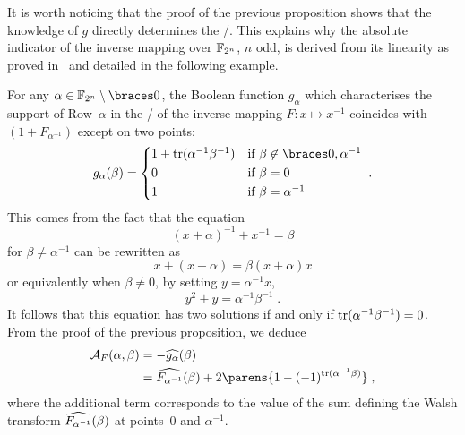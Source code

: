It is worth noticing that the proof of the previous proposition shows that the knowledge of $g$ directly determines the \ACT/.
This explains why the absolute indicator of the inverse mapping over $\mathbb{F}_{2^n}$, $n$ odd, is derived from its linearity as proved in~\cite[Theorem~1]{FF:ChaHelZin07} and detailed in the following example.
\begin{example}
    For any $\alpha \in \F_{2^n} \setminus \set{0}$, the Boolean function $g_\alpha$ which characterises the support of Row~$\alpha$ in the \DDT/ of the inverse mapping $F:x \mapsto x^{-1}$ coincides with $(1+F_{\alpha^{-1}})$ except on two points:
    \begin{equation*}
        g_\alpha(\beta) = \begin{cases*}
            1+\tr(\alpha^{-1}\beta^{-1}) & if $\beta \not \in \set{0, \alpha^{-1}}$\\
            0                            & if $\beta = 0$\\
            1                            & if $\beta = \alpha^{-1}$
        \end{cases*}\;.
    \end{equation*}
    This comes from the fact that the equation
    \begin{equation*}
        (x+\alpha)^{-1} + x^{-1} = \beta
    \end{equation*}
    for $\beta \neq \alpha^{-1}$ can be rewritten as
    \begin{equation*}
        x + (x+\alpha) = \beta (x+\alpha)x
    \end{equation*}
    or equivalently when $\beta \neq 0$, by setting $y=\alpha^{-1}x$,
    \begin{equation*}
        y^2+y = \alpha^{-1}\beta^{-1}\;.
    \end{equation*}
    It follows that this equation has two solutions if and only if $\operatorname{tr}(\alpha^{-1}\beta^{-1}) = 0$.
    From the proof of the previous proposition, we deduce
    \begin{align*}
        \AC{F}(\alpha, \beta)
        &= -\FC{g_\alpha}(\beta)  \\
        &= \FC{F_{\alpha^{-1}}}(\beta) + 2\parens{1 - (-1)^{\tr(\alpha^{-1}\beta)}}\;,
    \end{align*}
    where the additional term corresponds to the value of the sum defining the Walsh transform $\widehat{F_{\alpha^{-1}}}(\beta)$ at points~$0$ and $\alpha^{-1}$.
\end{example}


